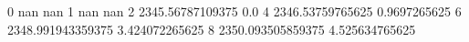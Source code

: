 0 nan nan
1 nan nan
2 2345.56787109375 0.0
4 2346.53759765625 0.9697265625
6 2348.991943359375 3.424072265625
8 2350.093505859375 4.525634765625
